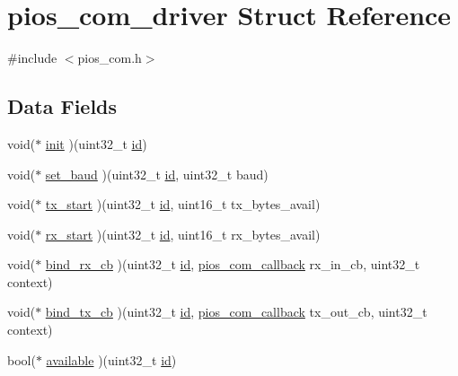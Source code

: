\hypertarget{structpios__com__driver}{\section{pios\-\_\-com\-\_\-driver \-Struct \-Reference}
\label{structpios__com__driver}
}


{\ttfamily \#include $<$pios\-\_\-com.\-h$>$}

\subsection*{\-Data \-Fields}
\begin{DoxyCompactItemize}
\item 
void($\ast$ \hyperlink{structpios__com__driver_a99b7480f64d07211d74f522059e33672}{init} )(uint32\-\_\-t \hyperlink{uavobjectmanager_8c_abaabdc509cdaba7df9f56c6c76f3ae19}{id})
\item 
void($\ast$ \hyperlink{structpios__com__driver_a904e9142a63c6aa2ada8e7b66855ff4a}{set\-\_\-baud} )(uint32\-\_\-t \hyperlink{uavobjectmanager_8c_abaabdc509cdaba7df9f56c6c76f3ae19}{id}, uint32\-\_\-t baud)
\item 
void($\ast$ \hyperlink{structpios__com__driver_a54751423be66aa5eeef4655f56ae656d}{tx\-\_\-start} )(uint32\-\_\-t \hyperlink{uavobjectmanager_8c_abaabdc509cdaba7df9f56c6c76f3ae19}{id}, uint16\-\_\-t tx\-\_\-bytes\-\_\-avail)
\item 
void($\ast$ \hyperlink{structpios__com__driver_a0c6384ecc39e1e638dddb2570602f7ff}{rx\-\_\-start} )(uint32\-\_\-t \hyperlink{uavobjectmanager_8c_abaabdc509cdaba7df9f56c6c76f3ae19}{id}, uint16\-\_\-t rx\-\_\-bytes\-\_\-avail)
\item 
void($\ast$ \hyperlink{structpios__com__driver_aed9041fdd757cf95e57c9d523e30fd57}{bind\-\_\-rx\-\_\-cb} )(uint32\-\_\-t \hyperlink{uavobjectmanager_8c_abaabdc509cdaba7df9f56c6c76f3ae19}{id}, \hyperlink{group___p_i_o_s___c_o_m_ga23f1888821f1f74a50c02adc459df597}{pios\-\_\-com\-\_\-callback} rx\-\_\-in\-\_\-cb, uint32\-\_\-t context)
\item 
void($\ast$ \hyperlink{structpios__com__driver_a94f7de4245688ab695cca1564be28cd6}{bind\-\_\-tx\-\_\-cb} )(uint32\-\_\-t \hyperlink{uavobjectmanager_8c_abaabdc509cdaba7df9f56c6c76f3ae19}{id}, \hyperlink{group___p_i_o_s___c_o_m_ga23f1888821f1f74a50c02adc459df597}{pios\-\_\-com\-\_\-callback} tx\-\_\-out\-\_\-cb, uint32\-\_\-t context)
\item 
bool($\ast$ \hyperlink{structpios__com__driver_ad9a0f07f6ebff7536ed37a97d4c41608}{available} )(uint32\-\_\-t \hyperlink{uavobjectmanager_8c_abaabdc509cdaba7df9f56c6c76f3ae19}{id})
\end{DoxyCompactItemize}



